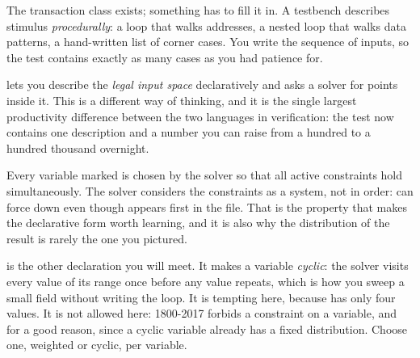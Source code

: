 The transaction class exists; something has to fill it in. A \VHDL{}
testbench describes stimulus \emph{procedurally}: a loop that walks addresses,
a nested loop that walks data patterns, a hand-written list of corner cases.
You write the sequence of inputs, so the test contains exactly as many cases
as you had patience for.

\SV{} lets you describe the \emph{legal input space} declaratively and asks a
solver for points inside it. This is a different way of thinking, and it is
the single largest productivity difference between the two languages in
verification: the test now contains one description and a number you can
raise from a hundred to a hundred thousand overnight.


Every variable marked  is chosen by the solver so that all active
constraints hold simultaneously. The solver considers the constraints as a
system, not in order:  can force  down even though
 appears first in the file. That is the property that makes the
declarative form worth learning, and it is also why the distribution of the
result is rarely the one you pictured.

 is the other declaration you will meet. It makes a
variable \emph{cyclic}: the solver visits every value of its range once before
any value repeats, which is how you sweep a small field without writing the
loop. It is tempting here, because  has only four values. It is not
allowed here: 1800-2017 forbids a  constraint on a 
variable, and for a good reason, since a cyclic variable already has a fixed
distribution. Choose one, weighted or cyclic, per variable.

